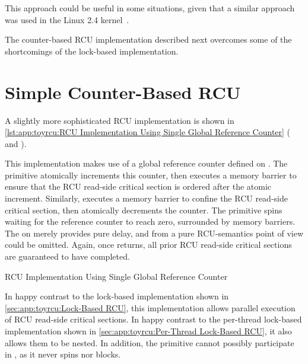 This approach could be useful in some situations, given that a similar
approach was used in the
Linux 2.4 kernel~\cite{Molnar00a}.

The counter-based RCU implementation described next overcomes some of
the shortcomings of the lock-based implementation.

\section{Simple Counter-Based RCU}
\label{sec:app:toyrcu:Simple Counter-Based RCU}

A slightly more sophisticated RCU implementation is shown in
\cref{lst:app:toyrcu:RCU Implementation Using Single Global Reference Counter}
( and ).
\begin{fcvref}
This implementation makes use of a global reference counter
 defined on .
The  primitive atomically increments this
counter, then executes a memory barrier to ensure that the
RCU read-side critical section is ordered after the atomic
increment.
Similarly,  executes a memory barrier to
confine the RCU read-side critical section, then atomically
decrements the counter.
The  primitive spins waiting for the reference
counter to reach zero, surrounded by memory barriers.
The  on  merely provides pure delay, and from
a pure RCU-semantics point of view could be omitted.
Again, once  returns, all prior
RCU read-side critical sections are guaranteed to have completed.
\end{fcvref}

\begin{listing}
\vspace*{-11pt}
\caption{RCU Implementation Using Single Global Reference Counter}
\label{lst:app:toyrcu:RCU Implementation Using Single Global Reference Counter}
\end{listing}

In happy contrast to the lock-based implementation shown in
\cref{sec:app:toyrcu:Lock-Based RCU}, this implementation
allows parallel execution of RCU read-side critical sections.
In happy contrast to the per-thread lock-based implementation shown in
\cref{sec:app:toyrcu:Per-Thread Lock-Based RCU},
it also allows them to be nested.
In addition, the  primitive cannot possibly
participate in , as it never spins nor blocks.

